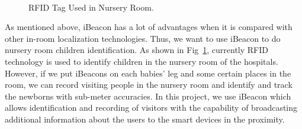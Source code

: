 \documentclass[12pt]{report}
\begin{document}
\begin{figure}[!t]
	\centering
	\\
	\caption{RFID Tag Used in Nursery Room.}
	\label{fig: 3.1}
\end{figure}

As mentioned above, iBeacon has a lot of advantages when it is compared with other in-room localization technologies. Thus, we want to use iBeacon to do nursery room children identification. As shown in Fig~\ref{fig: 3.1}, currently RFID technology is used to identify children in the nursery room of the hospitals. However, if we put iBeacons on each babies' leg and some certain places in the room, we can record visiting people in the nursery room and identify and track the newborns with sub-meter accuracies. In this project, we use iBeacon which allows identification and recording of visitors with the capability of broadcasting additional information about the users to the smart devices in the proximity.
\end{document}
